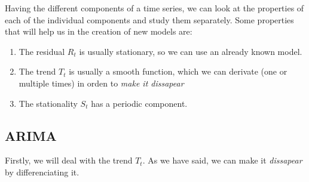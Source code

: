Having the different components of a time series, we can look at the properties of each of the individual components and study them separately. Some properties that will help us in the creation of new models are:

\begin{enumerate}
\item The residual \(R_t\) is usually stationary, so we can use an already known model.
\item The trend \(T_t\) is usually a smooth function, which we can derivate (one or multiple times) in orden to \emph{make it dissapear}

\item The stationality \(S_t\) has a periodic component.
\end{enumerate}



\subsection{ARIMA}

Firstly, we will deal with the trend \(T_t\). As we have said, we can make it \emph{dissapear} by differenciating it.


